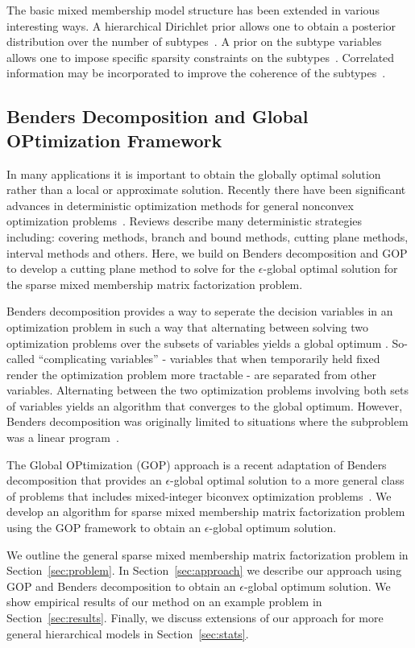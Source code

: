 \documentclass{article} %
\begin{document}
The basic mixed membership model structure has been extended in various
interesting ways. A hierarchical Dirichlet prior allows one to obtain a
posterior distribution over the number of subtypes~\cite{Teh2005}. A prior on
the subtype variables allows one to impose specific sparsity constraints on the
subtypes~\cite{Kaban:2007gz,MacKay:1992ul,Taddy:2012dd}. Correlated information
may be incorporated to improve the coherence of the subtypes~\cite{Blei2006}.


\subsection{Benders Decomposition and Global OPtimization Framework} 
In many applications it is important to obtain the globally optimal solution
rather than a local or approximate solution. Recently there have been
significant advances in deterministic optimization methods for general
nonconvex optimization problems~\cite{Floudas2008, Horst2002}. Reviews describe
many deterministic strategies including: covering methods, branch and bound
methods, cutting plane methods, interval methods and others. Here, we build on
Benders decomposition and GOP to develop a cutting plane method to solve for
the $\epsilon$-global optimal solution for the sparse mixed membership matrix
factorization problem.


Benders decomposition provides a way to seperate the decision variables in an
optimization problem in such a way that alternating between solving two
optimization problems over the subsets of variables yields a global optimum
\cite{Benders1962,Geoffrion1972}. So-called ``complicating variables'' -
variables that when temporarily held fixed render the optimization problem more
tractable - are separated from other variables. Alternating between the two
optimization problems involving both sets of variables yields an algorithm that
converges to the global optimum. However, Benders decomposition was originally
limited to situations where the subproblem was a linear
program~\cite{Benders1962}.

The Global OPtimization (GOP) approach is a recent adaptation of Benders
decomposition that provides an $\epsilon$-global optimal solution to a more
general class of problems that includes mixed-integer biconvex optimization
problems~\cite{Floudas1990}. We develop an algorithm for sparse mixed
membership matrix factorization problem using the GOP framework to obtain an
$\epsilon$-global optimum solution.

We outline the general sparse mixed membership matrix factorization problem in
Section~\ref{sec:problem}. In Section~\ref{sec:approach} we describe our
approach using GOP and Benders decomposition to obtain an $\epsilon$-global
optimum solution. We show empirical results of our method on an example problem
in Section~\ref{sec:results}. Finally, we discuss extensions of our approach
for more general hierarchical models in Section~\ref{sec:stats}.
\end{document}
